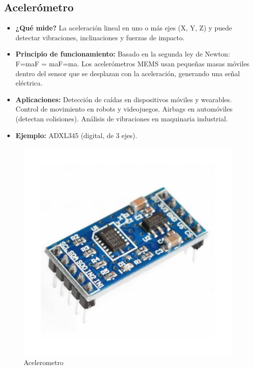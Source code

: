 \subsection*{Acelerómetro}
\begin{itemize}
	\item \textbf{¿Qué mide?} La aceleración lineal en uno o más ejes (X, Y, Z) y puede detectar vibraciones, inclinaciones y fuerzas de impacto.
	\item \textbf{Principio de funcionamiento:} Basado en la segunda ley de Newton: F=maF = maF=ma.
	Los acelerómetros MEMS usan pequeñas masas móviles dentro del sensor que se desplazan con la aceleración, generando una señal eléctrica.
	\item \textbf{Aplicaciones:} Detección de caídas en dispositivos móviles y wearables.
	Control de movimiento en robots y videojuegos.
	Airbags en automóviles (detectan colisiones).
	Análisis de vibraciones en maquinaria industrial.
	\item \textbf{Ejemplo:} ADXL345 (digital, de 3 ejes).
\end{itemize}
\begin{figure}[h]
	\centering
	\includegraphics[width=0.3\linewidth]{img/acelerometro}
	\caption{Acelerometro}
	\label{fig:acelerometro}
\end{figure}

